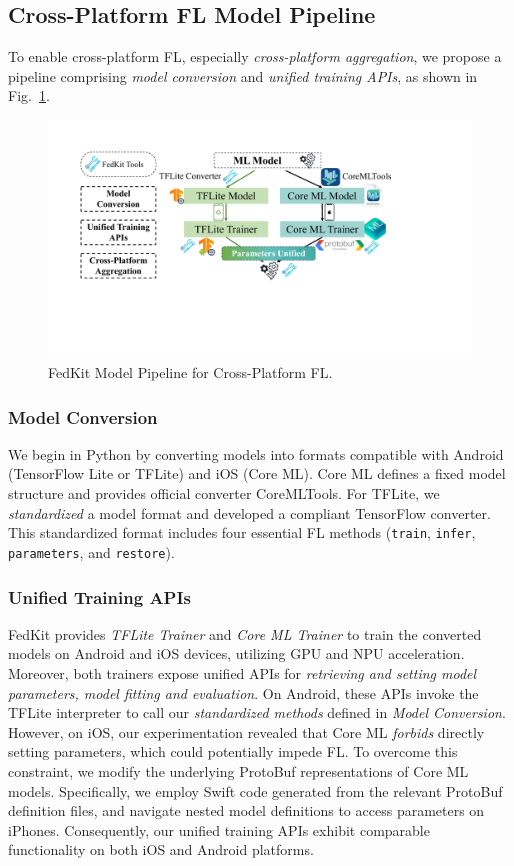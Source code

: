 \documentclass[letterpaper]{article} %
\begin{document}
\subsection{Cross-Platform FL Model Pipeline}

To enable cross-platform FL,
especially \textit{cross-platform aggregation},
we propose a pipeline comprising
\textit{model conversion} and
\textit{unified training APIs},
as shown in Fig.~\ref{cross_fl}.

\begin{figure}
    \centering
    \includegraphics*[width=\linewidth]{model_pipeline.pdf}
    \caption{FedKit Model Pipeline for Cross-Platform FL.}
    \label{cross_fl}
\end{figure}

\subsubsection{Model Conversion}
We begin in Python by converting models into formats compatible with
Android (TensorFlow Lite or TFLite) and iOS (Core ML).
Core ML defines a fixed model structure and provides
official converter CoreMLTools.
For TFLite, we \textit{standardized} a model format and
developed a compliant TensorFlow converter.
This standardized format includes
four essential FL methods
(\lstinline{train}, \lstinline{infer}, \lstinline{parameters},
and \lstinline{restore}).


\subsubsection{Unified Training APIs}
FedKit provides \textit{TFLite Trainer} and \textit{Core ML Trainer} to
train the converted models on Android and iOS devices,
utilizing GPU and NPU acceleration.
Moreover, both trainers expose unified APIs for
\textit{retrieving and setting model parameters,
model fitting and evaluation}.
On Android, these APIs invoke the TFLite interpreter to call
our \textit{standardized methods} defined in \textit{Model Conversion}.
However, on iOS, our experimentation revealed that
Core ML \textit{forbids} directly setting parameters, which could potentially impede FL.
To overcome this constraint,
we modify the underlying ProtoBuf representations of
Core ML models.
Specifically,
we employ Swift code generated from the relevant ProtoBuf definition files,
and navigate nested model definitions to access parameters on iPhones.
Consequently, our unified training APIs exhibit comparable functionality on
both iOS and Android platforms.
\end{document}
